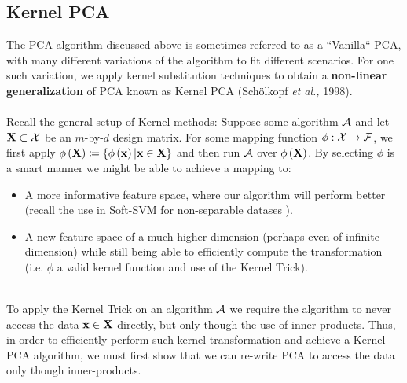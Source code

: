 \subsection{Kernel PCA}\label{kernel_pca}
The PCA algorithm discussed above is sometimes referred to as a ``Vanilla`` PCA, with many different variations of the algorithm to fit different scenarios. For one such variation, we apply kernel substitution techniques to obtain a \textbf{non-linear generalization} of PCA known as Kernel PCA (Sch\"olkopf \textit{et al.,} 1998). 
\\~\\Recall the general setup of Kernel methods: Suppose some algorithm $\mathcal{A}$ and let $\mathbf{X}\subset\mathcal{X}$ be an $m$-by-$d$ design matrix. For some mapping function $\phi:\mathcal{X}\rightarrow\mathcal{F}$, we first apply $\phi\left(\mathbf{X}\right)\coloneqq\left\{\phi\left(\mathbf{x}\right) | \mathbf{x}\in\mathbf{X}\right\}$ and then run $\mathcal{A}$ over $\phi\left(\mathbf{X}\right)$. By selecting $\phi$ is a smart manner we might be able to achieve a mapping to:
~\\\begin{itemize}
	\item A more informative feature space, where our algorithm will perform better (recall the use in Soft-SVM for non-separable datases ).\\
	\item A new feature space of a much higher dimension (perhaps even of infinite dimension) while still being able to efficiently compute the transformation (i.e. $\phi$ a valid kernel function and use of the Kernel Trick).
\end{itemize}

~\\To apply the Kernel Trick on an algorithm $\mathcal{A}$ we require the algorithm to never access the data $\mathbf{x}\in\mathbf{X}$ directly, but only though the use of inner-products. Thus, in order to efficiently perform such kernel transformation and achieve a Kernel PCA algorithm, we must first show that we can re-write PCA to access the data only though inner-products.


